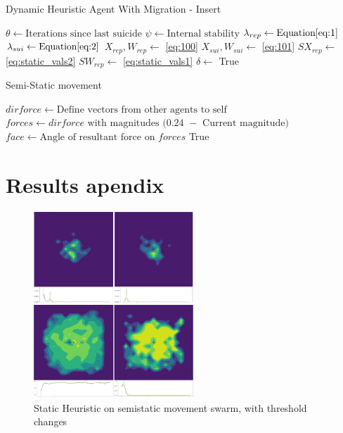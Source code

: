 \documentclass{UoYCSproject}
\begin{document}
\begin{algorithm}
\caption{Dynamic Heuristic Agent With Migration - Insert}
\label{Agent_Control_Loop3}
\begin{algorithmic}[1]
\State $\theta \gets \text{Iterations since last suicide}$
\State $\psi \gets \text{Internal stability}$
\State $\lambda_{rep} \gets \text{Equation} \ref{eq:1}$
\State $\lambda_{sui}  \gets \text{Equation} \ref{eq:2}$
\State $X_{rep}, W_{rep} \gets $ \ref{eq:100}
\State $X_{sui}, W_{sui} \gets $ \ref{eq:101}
\State
\State $SX_{rep} \gets $ \ref{eq:static_vals2}
\State $SW_{rep} \gets $ \ref{eq:static_vals1}
\State
\State $\delta \gets$ 
\State
{}
\State {}
\State
{}
\State {}
\State \Return True
\EndIf
\EndIf
\end{algorithmic}
\end{algorithm}


\begin{algorithm}
\caption{Semi-Static movement}
\label{semistaticmove}
\begin{algorithmic}[1]
\State $dirforce \gets \text{Define vectors from other agents to self}$
\State $forces \gets \text{$dirforce$ with magnitudes $($0.24 $-$ Current magnitude$)$}$
\State
\State {}
\State
\State $face \gets \text{Angle of resultant force on $forces$}$
\State {}
\State
\State \Return True
\EndProcedure
\end{algorithmic}
\end{algorithm}



\chapter{Results apendix}

\begin{figure}[htb]
\label{fig:Threshold_Changes}
\begin{center}
\centering
\includegraphics[height=7cm]{"./Static_Heuristic/Threshold_Changes.png"}
\caption{Static Heuristic on semi\-static movement swarm, with threshold changes}
\end{center}
\end{figure}
\end{document}
